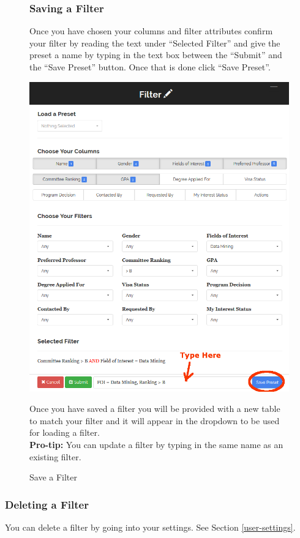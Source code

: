 \documentclass[fontsize=12pt,paper=letter,twoside]{scrartcl}
\begin{document}
\begin{figure}[!htb]
\subsubsection{Saving a Filter}
Once you have chosen your columns and filter attributes confirm your filter by reading the text under ``Selected Filter'' and give the preset a name by typing in the text box between the ``Submit'' and the ``Save Preset'' button. Once that is done click ``Save Preset''.
\begin{center}
\includegraphics[width=.99\textwidth]{images/save_filter.png}
\end{center}
\caption{Save a Filter}
Once you have saved a filter you will be provided with a new table to match your filter and it will appear in the dropdown to be used for loading a filter.\\
\textbf{Pro-tip:} You can update a filter by typing in the same name as an existing filter.
\label{fig:save_filter}
\end{figure}

\subsubsection{Deleting a Filter}
You can delete a filter by going into your settings. See Section \ref{user-settings}.
\end{document}
